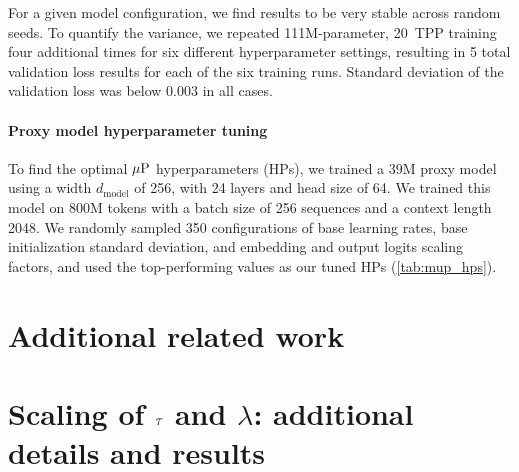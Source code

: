 For a given model configuration, we find results to be very stable
across random seeds.  To quantify the variance, we repeated
111M-parameter, 20~TPP training four additional times for six
different hyperparameter settings, resulting in 5 total validation
loss results for each of the six training runs.  Standard deviation of
the validation loss was below 0.003 in all cases.

\paragraph{Proxy model hyperparameter tuning}\label{sec:proxy_tuning}



To find the optimal $\mbox{$\mu$P}$ hyperparameters (HPs), we trained a 39M
proxy model using a width $d_{\text{model}}$ of 256, with 24 layers
and head size of 64.  We trained this model on 800M tokens with a
batch size of 256 sequences and a context length 2048.  We randomly
sampled 350 configurations of base learning rates, base initialization
standard deviation, and embedding and output logits scaling factors,
and used the top-performing values as our tuned HPs
(\cref{tab:mup_hps}).

\section{Additional related work}\label{sec:related}


\section{Scaling of $\tau$ and $\lambda$: additional details and results}

%


